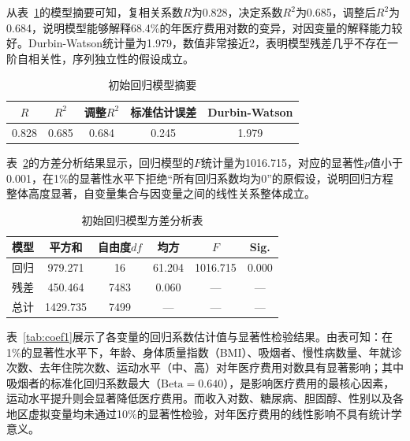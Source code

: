 \documentclass[a4paper]{ctexart}
\begin{document}
从表~\ref{tab:modelsum1}的模型摘要可知，复相关系数\(R\)为0.828，决定系数\(R^2\)为0.685，调整后\(R^2\)为0.684，说明模型能够解释68.4\%的年医疗费用对数的变异，对因变量的解释能力较好。Durbin-Watson统计量为1.979，数值非常接近2，表明模型残差几乎不存在一阶自相关性，序列独立性的假设成立。

\begin{table}[H]
\centering
\caption{初始回归模型摘要}
\label{tab:modelsum1}
\begin{tabular}{c c c c c}
\toprule
\(R\) & \(R^2\) & 调整\(R^2\) & 标准估计误差 & Durbin-Watson \\
\midrule
0.828 & 0.685 & 0.684 & 0.245 & 1.979 \\
\bottomrule
\end{tabular}
\end{table}

表~\ref{tab:anova1}的方差分析结果显示，回归模型的\(F\)统计量为1016.715，对应的显著性\(p\)值小于0.001，在1\%的显著性水平下拒绝“所有回归系数均为0”的原假设，说明回归方程整体高度显著，自变量集合与因变量之间的线性关系整体成立。

\begin{table}[H]
\centering
\caption{初始回归模型方差分析表}
\label{tab:anova1}
\begin{tabular}{c c c c c c}
\toprule
模型 & 平方和 & 自由度\(df\) & 均方 & \(F\) & Sig. \\
\midrule
回归 & 979.271 & 16 & 61.204 & 1016.715 & 0.000 \\
残差 & 450.464 & 7483 & 0.060 & — & — \\
总计 & 1429.735 & 7499 & — & — & — \\
\bottomrule
\end{tabular}
\end{table}

表~\ref{tab:coef1}展示了各变量的回归系数估计值与显著性检验结果。由表可知：在1\%的显著性水平下，年龄、身体质量指数（BMI）、吸烟者、慢性病数量、年就诊次数、去年住院次数、运动水平（中、高）对年医疗费用对数具有显著影响；其中吸烟者的标准化回归系数最大（\(\text{Beta}=0.640\)），是影响医疗费用的最核心因素，运动水平提升则会显著降低医疗费用。而收入对数、糖尿病、胆固醇、性别以及各地区虚拟变量均未通过10\%的显著性检验，对年医疗费用的线性影响不具有统计学意义。
\end{document}

